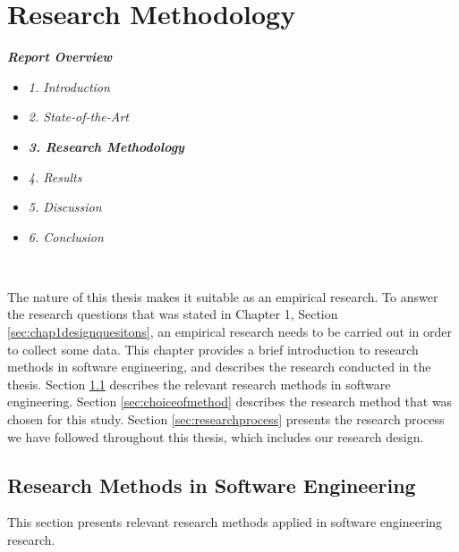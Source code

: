 
\chapter{Research Methodology}
\label{chap:researchmethod}


\textit{\textbf{Report Overview}}
\begin{itemize}
	\item \textit{1. Introduction}
	\item \textit{2. State-of-the-Art}
	\item \textit{\textbf{3. Research Methodology}}
	\item \textit{4. Results}
	\item \textit{5. Discussion}
	\item \textit{6. Conclusion}
\end{itemize} \


The nature of this thesis makes it suitable as an empirical research. To answer the research questions that was stated in Chapter 1, Section \ref{sec:chap1designquesitons}, an empirical research needs to be carried out in order to collect some data. This chapter provides a brief introduction to research methods in software engineering, and describes the research conducted in the thesis. Section \ref{sec:researchmethodsinsoftwareengineering} describes the relevant research methods in software engineering. Section \ref{sec:choiceofmethod} describes the research method that was chosen for this study. Section \ref{sec:researchprocess} presents the research process we have followed throughout this thesis, which includes our research design.





\section{Research Methods in Software Engineering}
\label{sec:researchmethodsinsoftwareengineering}
 This section presents relevant research methods applied in software engineering research. 


